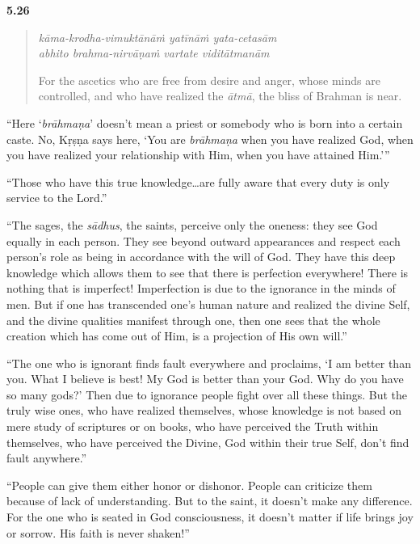 \par\noindent\textbf{5.26}\par
\begin{verse}
\textit{kāma-krodha-vimuktānāṁ yatīnāṁ yata-cetasām} \\
\textit{abhito brahma-nirvāṇaṁ vartate viditātmanām}

\noindent For the ascetics who are free from desire and anger, whose minds are controlled, and who have realized the \textit{ātmā}, the bliss of Brahman is near.
\end{verse}
\par


\enquote{Here \enquote{\textit{brāhmaṇa}} doesn’t mean a priest or somebody who is born into a certain caste. No, Kṛṣṇa says here, \enquote{You are \textit{brāhmaṇa} when you have realized God, when you have realized your relationship with Him, when you have attained Him.}}

\enquote{Those who have this true knowledge\ldots are fully aware that every duty is only service to the Lord.}

\enquote{The sages, the \textit{sādhus}, the saints, perceive only the oneness: they see God equally in each person. They see beyond outward appearances and respect each person’s role as being in accordance with the will of God. They have this deep knowledge which allows them to see that there is perfection everywhere! There is nothing that is imperfect! Imperfection is due to the ignorance in the minds of men. But if one has transcended one’s human nature and realized the divine Self, and the divine qualities manifest through one, then one sees that the whole creation which has come out of Him, is a projection of His own will.}

\enquote{The one who is ignorant finds fault everywhere and proclaims, \enquote{I am better than you. What I believe is best! My God is better than your God. Why do you have so many gods?} Then due to ignorance people fight over all these things. But the truly wise ones, who have realized themselves, whose knowledge is not based on mere study of scriptures or on books, who have perceived the Truth within themselves, who have perceived the Divine, God within their true Self, don’t find fault anywhere.}

\enquote{People can give them either honor or dishonor. People can criticize them because of lack of understanding. But to the saint, it doesn’t make any difference. For the one who is seated in God consciousness, it doesn’t matter if life brings joy or sorrow. His faith is never shaken!}

